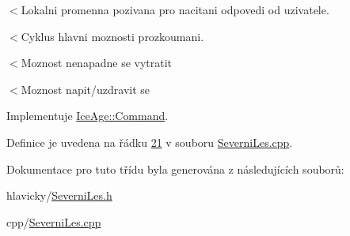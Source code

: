 $<$Lokalni promenna pozivana pro nacitani odpovedi od uzivatele.

$<$Cyklus hlavni moznosti prozkoumani.

$<$Moznost nenapadne se vytratit

$<$Moznost napit/uzdravit se 

Implementuje \hyperlink{classIceAge_1_1Command_a0466e88c0c9e2a44618c12f6c88b76fe}{Ice\+Age\+::\+Command}.



Definice je uvedena na řádku \hyperlink{SeverniLes_8cpp_source_l00021}{21} v souboru \hyperlink{SeverniLes_8cpp_source}{Severni\+Les.\+cpp}.



Dokumentace pro tuto třídu byla generována z následujících souborů\+:\begin{DoxyCompactItemize}
\item 
hlavicky/\hyperlink{SeverniLes_8h}{Severni\+Les.\+h}\item 
cpp/\hyperlink{SeverniLes_8cpp}{Severni\+Les.\+cpp}\end{DoxyCompactItemize}
